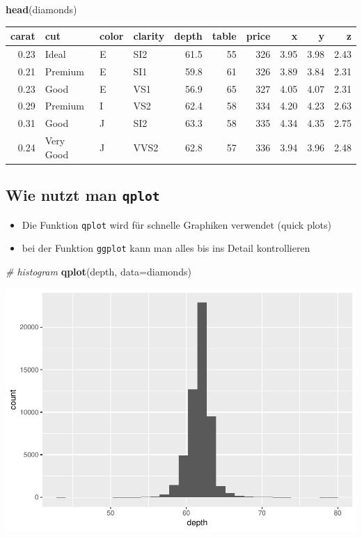\documentclass[]{article}
\newenvironment{Shaded}{\begin{snugshade}}{\end{snugshade}}
\newcommand{\KeywordTok}[1]{\textcolor[rgb]{0.13,0.29,0.53}{\textbf{{#1}}}}
\newcommand{\DataTypeTok}[1]{\textcolor[rgb]{0.13,0.29,0.53}{{#1}}}
\newcommand{\CommentTok}[1]{\textcolor[rgb]{0.56,0.35,0.01}{\textit{{#1}}}}
\newcommand{\NormalTok}[1]{{#1}}
\providecommand{\tightlist}{%
  \setlength{\itemsep}{0pt}\setlength{\parskip}{0pt}}
\begin{document}
\begin{Shaded}
\begin{Highlighting}[]
\KeywordTok{head}\NormalTok{(diamonds)}
\end{Highlighting}
\end{Shaded}

\begin{longtable}[]{@{}rlllrrrrrr@{}}
\toprule
carat & cut & color & clarity & depth & table & price & x & y &
z\tabularnewline
\midrule
\endhead
0.23 & Ideal & E & SI2 & 61.5 & 55 & 326 & 3.95 & 3.98 &
2.43\tabularnewline
0.21 & Premium & E & SI1 & 59.8 & 61 & 326 & 3.89 & 3.84 &
2.31\tabularnewline
0.23 & Good & E & VS1 & 56.9 & 65 & 327 & 4.05 & 4.07 &
2.31\tabularnewline
0.29 & Premium & I & VS2 & 62.4 & 58 & 334 & 4.20 & 4.23 &
2.63\tabularnewline
0.31 & Good & J & SI2 & 63.3 & 58 & 335 & 4.34 & 4.35 &
2.75\tabularnewline
0.24 & Very Good & J & VVS2 & 62.8 & 57 & 336 & 3.94 & 3.96 &
2.48\tabularnewline
\bottomrule
\end{longtable}

\subsection{\texorpdfstring{Wie nutzt man
\texttt{qplot}}{Wie nutzt man qplot}}\label{wie-nutzt-man-qplot}

\begin{itemize}
\tightlist
\item
  Die Funktion \texttt{qplot} wird für schnelle Graphiken verwendet
  (quick plots)
\item
  bei der Funktion \texttt{ggplot} kann man alles bis ins Detail
  kontrollieren
\end{itemize}

\begin{Shaded}
\begin{Highlighting}[]
\CommentTok{# histogram}
\KeywordTok{qplot}\NormalTok{(depth, }\DataTypeTok{data=}\NormalTok{diamonds)}
\end{Highlighting}
\end{Shaded}

\includegraphics{Intro_Datenanalyse1_files/figure-latex/unnamed-chunk-220-1.pdf}
\end{document}
